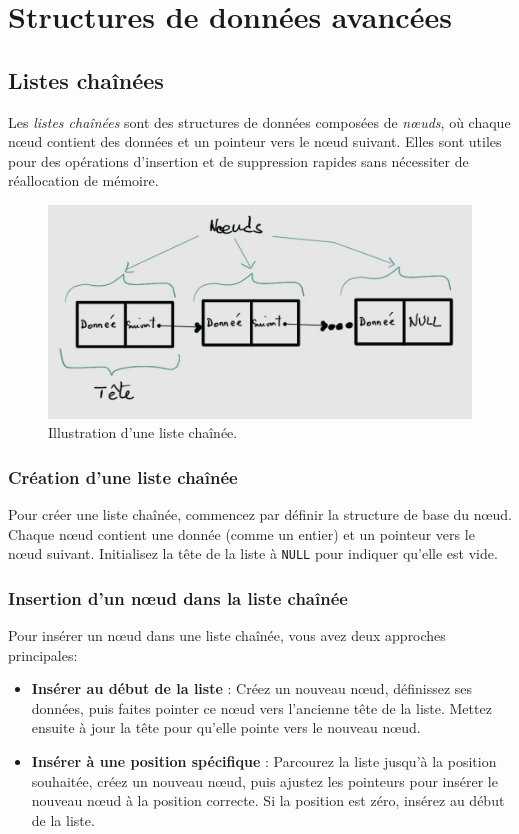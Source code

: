 \chapter{Structures de données avancées}

\section{Listes chaînées}
Les \emph{listes chaînées} sont des structures de données composées de \emph{nœuds}, où chaque nœud contient des données et un pointeur vers le nœud suivant. Elles sont utiles pour des opérations d'insertion et de suppression rapides sans nécessiter de réallocation de mémoire.

\begin{figure}[H]
	\centering
	\includegraphics[scale=.3]{image/linkedlist}
	\caption{Illustration d'une liste chaînée.}
\end{figure}

\subsection{Création d'une liste chaînée}

Pour créer une liste chaînée, commencez par définir la structure de base du nœud. Chaque nœud contient une donnée (comme un entier) et un pointeur vers le nœud suivant. Initialisez la tête de la liste à \texttt{NULL} pour indiquer qu'elle est vide.

\subsection{Insertion d'un nœud dans la liste chaînée}

Pour insérer un nœud dans une liste chaînée, vous avez deux approches principales:

\begin{itemize}
	\item \textbf{Insérer au début de la liste} : Créez un nouveau nœud, définissez ses données, puis faites pointer ce nœud vers l'ancienne tête de la liste. Mettez ensuite à jour la tête pour qu'elle pointe vers le nouveau nœud.
	
	\item \textbf{Insérer à une position spécifique} : Parcourez la liste jusqu'à la position souhaitée, créez un nouveau nœud, puis ajustez les pointeurs pour insérer le nouveau nœud à la position correcte. Si la position est zéro, insérez au début de la liste.
\end{itemize}

